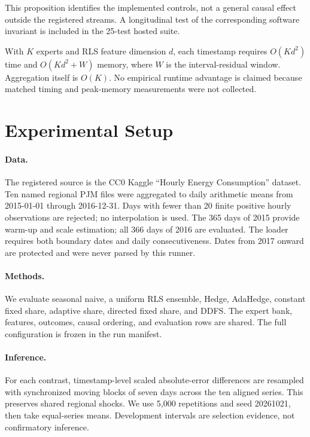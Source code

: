 \documentclass[10pt]{article}
\newcommand{\ddfs}{\textsc{DDFS}}
\begin{document}
This proposition identifies the implemented controls, not a general causal effect
outside the registered streams. A longitudinal test of the corresponding software
invariant is included in the 25-test hosted suite.

With $K$ experts and RLS feature dimension $d$, each timestamp requires
$O(Kd^2)$ time and $O(Kd^2+W)$ memory, where $W$ is the interval-residual window.
Aggregation itself is $O(K)$. No empirical runtime advantage is claimed because
matched timing and peak-memory measurements were not collected.

\section{Experimental Setup}

\paragraph{Data.}
The registered source is the CC0 Kaggle ``Hourly Energy Consumption'' dataset.
Ten named regional PJM files were aggregated to daily arithmetic means from
2015-01-01 through 2016-12-31. Days with fewer than 20 finite positive hourly
observations are rejected; no interpolation is used. The 365 days of 2015 provide
warm-up and scale estimation; all 366 days of 2016 are evaluated. The loader requires
both boundary dates and daily consecutiveness. Dates from 2017 onward are protected
and were never parsed by this runner.

\paragraph{Methods.}
We evaluate seasonal naive, a uniform RLS ensemble, Hedge, AdaHedge, constant fixed
share, adaptive share, directed fixed share, and \ddfs. The expert bank, features,
outcomes, causal ordering, and evaluation rows are shared. The full configuration is
frozen in the run manifest.

\paragraph{Inference.}
For each contrast, timestamp-level scaled absolute-error differences are resampled
with synchronized moving blocks of seven days across the ten aligned series. This
preserves shared regional shocks. We use 5,000 repetitions and seed 20261021, then
take equal-series means. Development intervals are selection evidence, not
confirmatory inference.
\end{document}
